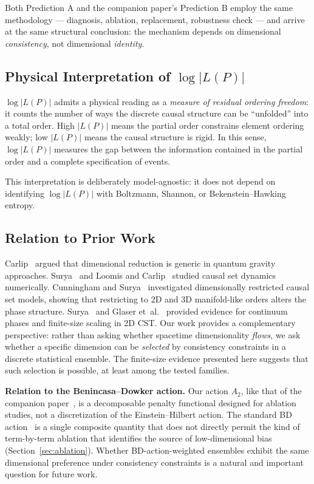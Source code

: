 \documentclass[entropy,article,submit,pdftex,moreauthors]{Definitions/mdpi}
\begin{document}
Both Prediction A and the companion paper's Prediction B employ the same methodology --- diagnosis, ablation, replacement, robustness check --- and arrive at the same structural conclusion: the mechanism depends on dimensional \emph{consistency}, not dimensional \emph{identity}.

\subsection{Physical Interpretation of $\log|L(P)|$}

$\log|L(P)|$ admits a physical reading as a \emph{measure of residual ordering
freedom}: it counts the number of ways the discrete causal structure can be
``unfolded'' into a total order. High $|L(P)|$ means the partial order
constrains element ordering weakly; low $|L(P)|$ means the causal structure is
rigid. In this sense, $\log|L(P)|$ measures the gap between the information
contained in the partial order and a complete specification of events.

This interpretation is deliberately model-agnostic: it does not depend on
identifying $\log|L(P)|$ with Boltzmann, Shannon, or Bekenstein--Hawking
entropy.

\subsection{Relation to Prior Work}

Carlip~\cite{carlip2017} argued that dimensional reduction is generic in quantum gravity approaches. Surya~\cite{surya2019} and Loomis and Carlip~\cite{loomis2018} studied causal set dynamics numerically. Cunningham and Surya~\cite{cunningham2020} investigated dimensionally restricted causal set models, showing that restricting to 2D and 3D manifold-like orders alters the phase structure. Surya~\cite{surya2012} and Glaser et~al.~\cite{glaser2018} provided evidence for continuum phases and finite-size scaling in 2D CST. Our work provides a complementary perspective: rather than asking whether spacetime dimensionality \emph{flows}, we ask whether a specific dimension can be \emph{selected} by consistency constraints in a discrete statistical ensemble. The finite-size evidence presented here suggests that such selection is possible, at least among the tested families.

\textbf{Relation to the Benincasa--Dowker action.} Our action $A_2$, like that of the companion paper~\cite{zhang2026companion}, is a decomposable penalty functional designed for ablation studies, not a discretization of the Einstein--Hilbert action. The standard BD action~\cite{benincasa2010,benincasa2011} is a single composite quantity that does not directly permit the kind of term-by-term ablation that identifies the source of low-dimensional bias (Section~\ref{sec:ablation}). Whether BD-action-weighted ensembles exhibit the same dimensional preference under consistency constraints is a natural and important question for future work.
\end{document}
